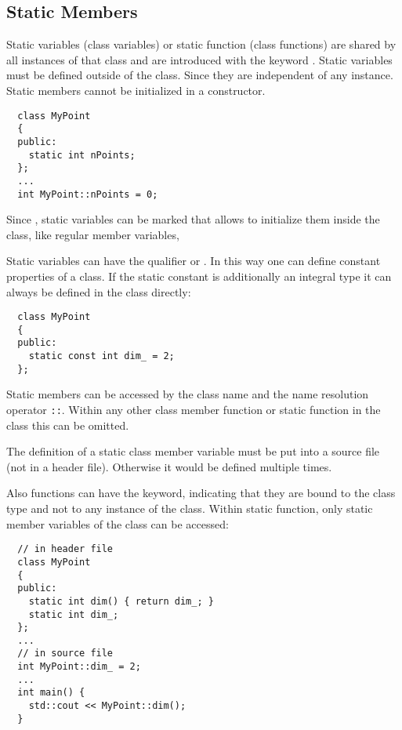 \subsection{Static Members}
Static variables (class variables) or static function (class functions) are shared by all instances of that class and are introduced with the keyword .
Static variables must be defined outside of the class. Since they are independent of any instance. Static members cannot be initialized in a constructor.
%
\begin{verbatim}
  class MyPoint
  {
  public:
    static int nPoints;
  };
  ...
  int MyPoint::nPoints = 0;
\end{verbatim}

Since \marginpar{[\cxx{17}]}, static variables can be marked  that allows to initialize them inside the class, like regular member
variables, \eg {}

Static variables can have the qualifier  or . In this way one can define constant properties of a class. If the static
constant is additionally an integral type it can always be defined in the class directly:
%
\begin{verbatim}
  class MyPoint
  {
  public:
    static const int dim_ = 2;
  };
\end{verbatim}

Static members can be accessed by the class name and the name resolution operator \texttt{::}. Within any other class member function or static function in the
class this can be omitted.

\begin{rem}
  The definition of a static class member variable must be put into a source file (not in a header file). Otherwise it would be defined multiple times.
\end{rem}

Also functions can have the  keyword, indicating that they are bound to the class type and not to any instance of the class. Within static
function, only static member variables of the class can be accessed:
%
\begin{verbatim}
  // in header file
  class MyPoint
  {
  public:
    static int dim() { return dim_; }
    static int dim_;
  };
  ...
  // in source file
  int MyPoint::dim_ = 2;
  ...
  int main() {
    std::cout << MyPoint::dim();
  }
\end{verbatim}

